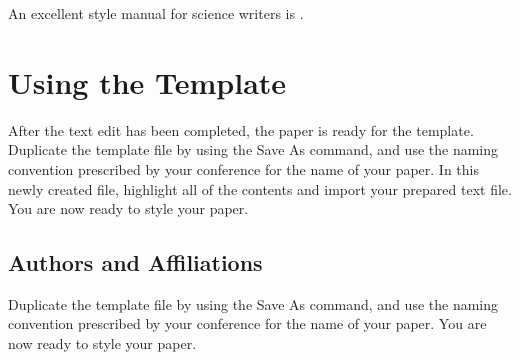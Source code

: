 \documentclass[conference,pbalance]{iaria}
\begin{document}
An excellent style manual for science writers is \cite{young2002technical}.

\section{Using the Template}
After the text edit has been completed, the paper is ready for the template. Duplicate the template file by using the Save As command, and use the naming convention prescribed by your conference for the name of your paper. In this newly created file, highlight all of the contents and import your prepared text file. You are now ready to style your paper.

\subsection{Authors and Affiliations}
Duplicate the template file by using the Save As command, and use the naming convention prescribed by your conference for the name of your paper. You are now ready to style your paper.

\end{document}
